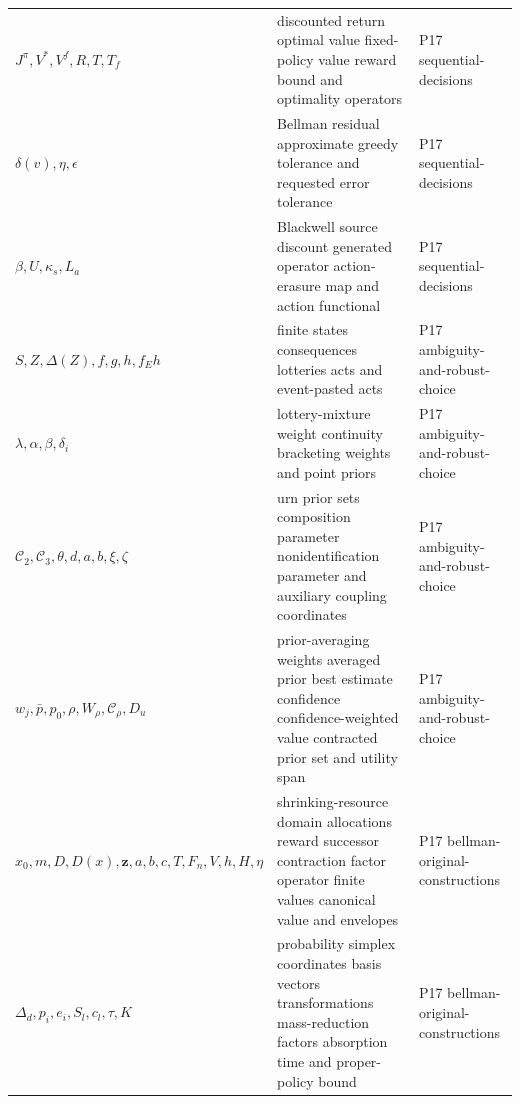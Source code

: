 \begin{longtable}{@{}p{}p{}p{}@{}}
\(J^\pi,\allowbreak V^*,\allowbreak V^f,\allowbreak R,\allowbreak T,\allowbreak T_f\) & discounted return optimal value fixed-policy value reward bound and optimality operators & P17 sequential-\allowbreak{}decisions \\
\(\delta(v),\allowbreak \eta,\allowbreak \epsilon\) & Bellman residual approximate greedy tolerance and requested error tolerance & P17 sequential-\allowbreak{}decisions \\
\(\beta,\allowbreak U,\allowbreak \kappa_s,\allowbreak L_a\) & Blackwell source discount generated operator action-erasure map and action functional & P17 sequential-\allowbreak{}decisions \\
\(S,\allowbreak Z,\allowbreak \Delta(Z),\allowbreak f,\allowbreak g,\allowbreak h,\allowbreak f_Eh\) & finite states consequences lotteries acts and event-pasted acts & P17 ambiguity-\allowbreak{}and-\allowbreak{}robust-\allowbreak{}choice \\
\(\lambda,\allowbreak \alpha,\allowbreak \beta,\allowbreak \delta_i\) & lottery-mixture weight continuity bracketing weights and point priors & P17 ambiguity-\allowbreak{}and-\allowbreak{}robust-\allowbreak{}choice \\
\(\mathcal C_2,\allowbreak \mathcal C_3,\allowbreak \theta,\allowbreak d,\allowbreak a,\allowbreak b,\allowbreak \xi,\allowbreak \zeta\) & urn prior sets composition parameter nonidentification parameter and auxiliary coupling coordinates & P17 ambiguity-\allowbreak{}and-\allowbreak{}robust-\allowbreak{}choice \\
\(w_j,\allowbreak \bar p,\allowbreak p_0,\allowbreak \rho,\allowbreak W_\rho,\allowbreak \mathcal C_\rho,\allowbreak D_u\) & prior-averaging weights averaged prior best estimate confidence confidence-weighted value contracted prior set and utility span & P17 ambiguity-\allowbreak{}and-\allowbreak{}robust-\allowbreak{}choice \\
\(x_0,\allowbreak m,\allowbreak D,\allowbreak D(x),\allowbreak \mathbf z,\allowbreak a,\allowbreak b,\allowbreak c,\allowbreak T,\allowbreak F_n,\allowbreak V,\allowbreak h,\allowbreak H,\allowbreak \eta\) & shrinking-resource domain allocations reward successor contraction factor operator finite values canonical value and envelopes & P17 bellman-\allowbreak{}original-\allowbreak{}constructions \\
\(\Delta_d,\allowbreak p_i,\allowbreak e_i,\allowbreak S_l,\allowbreak c_l,\allowbreak \tau,\allowbreak K\) & probability simplex coordinates basis vectors transformations mass-reduction factors absorption time and proper-policy bound & P17 bellman-\allowbreak{}original-\allowbreak{}constructions \\

\end{longtable}
